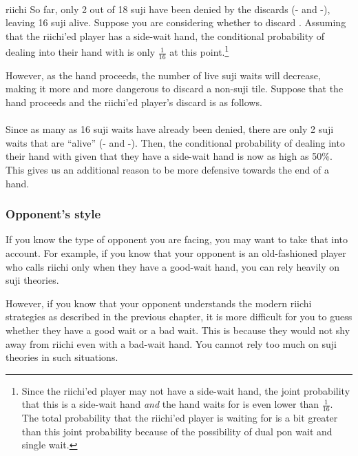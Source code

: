 {{\bp
\bei\fa{}\\
\hspace{53pt}\footnotesize{riichi}
\ep
So far, only 2 out of 18 {\jap suji} have been denied by the discards ({\LARGE{}-} and {\LARGE{}-}), leaving 16 {\jap suji} alive. Suppose you are considering whether to discard {\LARGE{}}. Assuming that the riichi'ed player has a side-wait hand, the conditional probability of dealing into their hand with {\LARGE{}} is only $\frac{1}{16}$ at this point.\footnote{Since the riichi'ed player may not have a side-wait hand, the joint probability that this is a side-wait hand \emph{and} the hand waits for  is even lower than $\frac{1}{16}$. The total probability that the riichi'ed player is waiting for  is a bit greater than this joint probability because of the possibility of dual {\jap pon} wait and single wait.}

\bigskip
However, as the hand proceeds, the number of live {\jap suji} waits will decrease, making it more and more dangerous to discard a non-{\jap suji} tile. Suppose that the hand proceeds and the riichi'ed player's discard is as follows. 
\bp
\bei\fa{}\\
\vspace{-10pt}
\hspace{-5pt}\\
\vspace{-10pt}
\hspace{-95pt}
\ep
Since as many as 16 {\jap suji} waits have already been denied, there are only 2 {\jap suji} waits that are ``alive'' ({\LARGE{}-} and {\LARGE{}-}). Then, the conditional probability of dealing into their hand with {\LARGE{}} given that they have a side-wait hand is now as high as 50\%. This gives us an additional reason to be more defensive towards the end of a hand. 

\subsubsection*{Opponent's style}
If you know the type of opponent you are facing, you may want to take that into account. For example, if you know that your opponent is an old-fashioned player who calls riichi only when they have a good-wait hand, you can rely heavily on {\jap suji} theories. 

\bigskip
However, if you know that your opponent understands the modern riichi strategies as described in the previous chapter, it is more difficult for you to guess whether they have a good wait or a bad wait. This is because they would not shy away from riichi even with a bad-wait hand. You cannot rely too much on {\jap suji} theories in such situations. 

}}
